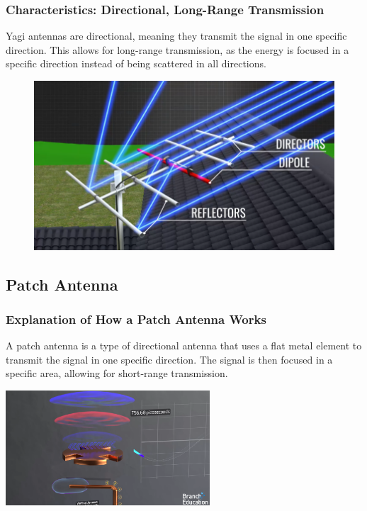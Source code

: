 \documentclass{beamer}
\begin{document}
\begin{frame}
    \frametitle{Characteristics: Directional, Long-Range Transmission}
    Yagi antennas are directional, meaning they transmit the signal in one specific direction. This allows for long-range transmission, as the energy is focused in a specific direction instead of being scattered in all directions.
        \begin{figure}[htbp]
           \begin{minipage}[b]{0.5\linewidth}
            \centering
            \includegraphics[width=0.8\linewidth]{yagibeam.png}
        \end{minipage}
        \end{figure}
        
\end{frame}


\subsection{Patch Antenna}

\begin{frame}
    \frametitle{Explanation of How a Patch Antenna Works}
    A patch antenna is a type of directional antenna that uses a flat metal element to transmit the signal in one specific direction. The signal is then focused in a specific area, allowing for short-range transmission.
        \begin{center}
        
    \includegraphics[width=3in]{patch2.png}
    \end{center}
\end{frame}
\end{document}

